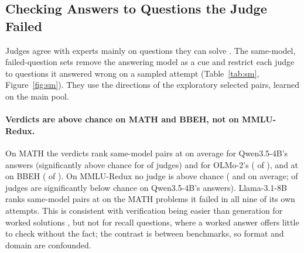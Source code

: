 \documentclass[11pt]{article}
\begin{document}
\subsection{Checking Answers to Questions the Judge Failed}
\label{sec:beyond}

\begin{table}[t]
\centering
\small

\caption{Same-model pairs on questions the judge failed on a sampled attempt: verdict ranking (mean over judges; 50 = chance) and mean gains of each readout over the verdict (bold: 95\% interval above 0). Directions and layers are those of the exploratory selected pairs, learned on the main pool. BBEH pairs come from four answering models that are also in the main pool. $^\dagger$Llama-3.1-8B on the  MATH questions it failed in all 9 of its own attempts. Per judge: Appendix Table~\ref{tab:smpairs}.}
\label{tab:sm}
\end{table}

Judges agree with experts mainly on questions they can solve \citep{krumdick2026nofreelabels,tan2025judgebench}. The same-model, failed-question sets remove the answering model as a cue and restrict each judge to questions it answered wrong on a sampled attempt (Table~\ref{tab:sm}, Figure~\ref{fig:sm}). They use the directions of the exploratory selected pairs, learned on the main pool.

\paragraph{Verdicts are above chance on MATH and BBEH, not on MMLU-Redux.} On MATH the verdicts rank same-model pairs at  on average for Qwen3.5-4B's answers (significantly above chance for  of  judges) and  for OLMo-2's ( of ), and at  on BBEH ( of ). On MMLU-Redux no judge is above chance ( and  on average;  of  judges are significantly below chance on Qwen3.5-4B's answers). Llama-3.1-8B ranks same-model pairs at  on the  MATH problems it failed in all nine of its own attempts. This is consistent with verification being easier than generation for worked solutions \citep{cobbe2021training,song2025mind}, but not for recall questions, where a worked answer offers little to check without the fact; the contrast is between benchmarks, so format and domain are confounded.
\end{document}
